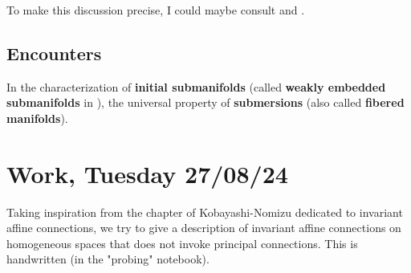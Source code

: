 \documentclass[a4paper,12pt,parskip=half*,chapterprefix=true,numbers=noendperiod]{scrreprt}
\theoremstyle{definition}
\theoremstyle{remark}
\begin{document}
To make this discussion precise, I could maybe consult \cite{KMS:NatDiffGeo} and \cite{vakar:BundlesGauges}.

\subsection{Encounters}

In \cite{KMS:NatDiffGeo} the characterization of \textbf{initial submanifolds} (called \textbf{weakly embedded submanifolds} in \cite{Lee:IntSmMan}), the universal property of \textbf{submersions} (also called \textbf{fibered manifolds}).

\section{Work, Tuesday 27/08/24}

Taking inspiration from the chapter of Kobayashi-Nomizu \cite{KN:FundDiffGeo} dedicated to invariant affine connections, we try to give a description of invariant affine connections on homogeneous spaces that does not invoke principal connections. This is handwritten \cite{personalHand:Connections} (in the "probing" notebook).
\end{document}
